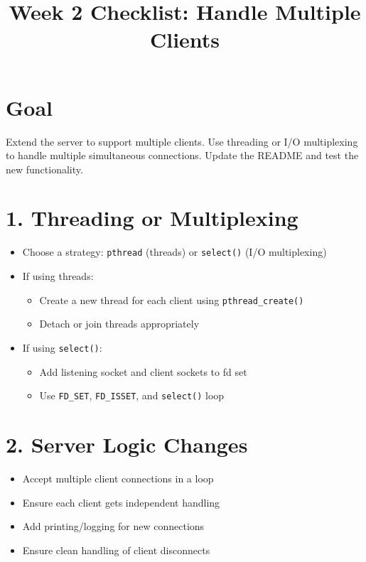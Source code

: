 \documentclass{article}
\title{Week 2 Checklist: Handle Multiple Clients}
\date{}
\begin{document}
\maketitle

\section*{Goal}
Extend the server to support multiple clients. Use threading or I/O multiplexing to handle multiple simultaneous connections. Update the README and test the new functionality.

\section*{1. Threading or Multiplexing}
\begin{itemize}[label=--]
    \item Choose a strategy: \texttt{pthread} (threads) or \texttt{select()} (I/O multiplexing)
    \item If using threads:
    \begin{itemize}
        \item Create a new thread for each client using \texttt{pthread\_create()}
        \item Detach or join threads appropriately
    \end{itemize}
    \item If using \texttt{select()}:
    \begin{itemize}
        \item Add listening socket and client sockets to fd set
        \item Use \texttt{FD\_SET}, \texttt{FD\_ISSET}, and \texttt{select()} loop
    \end{itemize}
\end{itemize}

\section*{2. Server Logic Changes}
\begin{itemize}[label=--]
    \item Accept multiple client connections in a loop
    \item Ensure each client gets independent handling
    \item Add printing/logging for new connections
    \item Ensure clean handling of client disconnects
\end{itemize}
\end{document}
